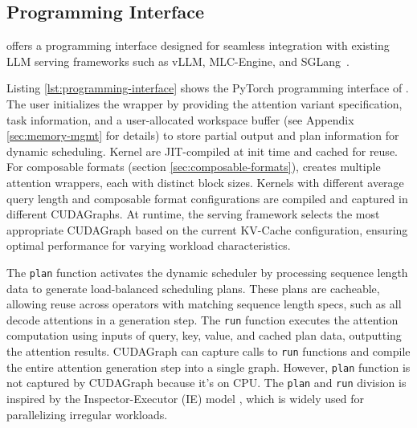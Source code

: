 \subsection{Programming Interface}
\label{sec:programming-interface}

\sys offers a programming interface designed for seamless integration with existing LLM serving frameworks such as vLLM\cite{kwon2023vllm}, MLC-Engine\cite{mlcllm}, and SGLang~\cite{zheng2023sglang}.



Listing \ref{lst:programming-interface} shows the PyTorch programming interface of \sys. The user initializes the wrapper by providing the attention variant specification, task information, and a user-allocated workspace buffer (see Appendix \ref{sec:memory-mgmt} for details) to store partial output and plan information for \sys dynamic scheduling.
Kernel are JIT-compiled at init time and cached for reuse. For composable formats (section \ref{sec:composable-formats}), \sys creates multiple attention wrappers, each with distinct block sizes. Kernels with different average query length and composable format configurations are compiled and captured in different CUDAGraphs. At runtime, the serving framework selects the most appropriate CUDAGraph based on the current KV-Cache configuration, ensuring optimal performance for varying workload characteristics.

The \texttt{plan} function activates the dynamic scheduler by processing sequence length data to generate load-balanced scheduling plans. These plans are cacheable, allowing reuse across operators with matching sequence length specs, such as all decode attentions in a generation step. The \texttt{run} function executes the attention computation using inputs of query, key, value, and cached plan data, outputting the attention results. 
CUDAGraph can capture calls to \texttt{run} functions and compile the entire attention generation step into a single graph. However, \texttt{plan} function is not captured by CUDAGraph because it's on CPU. The \texttt{plan} and \texttt{run} division is inspired by the Inspector-Executor (IE) model \cite{ravi1988principles, saltz1991preprocessed, ravi1993runtime},  which is widely used for parallelizing irregular workloads.
